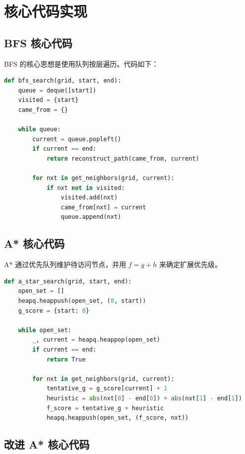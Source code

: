 \chapter{核心代码实现}\label{chap:code}

\section{BFS 核心代码}

BFS 的核心思想是使用队列按层遍历。代码如下：

\begin{lstlisting}[language=Python,caption={BFS 的核心实现},label={code:bfs}]
def bfs_search(grid, start, end):
    queue = deque([start])
    visited = {start}
    came_from = {}

    while queue:
        current = queue.popleft()
        if current == end:
            return reconstruct_path(came_from, current)

        for nxt in get_neighbors(grid, current):
            if nxt not in visited:
                visited.add(nxt)
                came_from[nxt] = current
                queue.append(nxt)
\end{lstlisting}

\section{A* 核心代码}

A* 通过优先队列维护待访问节点，并用 $f=g+h$ 来确定扩展优先级。

\begin{lstlisting}[language=Python,caption={A* 的节点扩展逻辑},label={code:astar}]
def a_star_search(grid, start, end):
    open_set = []
    heapq.heappush(open_set, (0, start))
    g_score = {start: 0}

    while open_set:
        _, current = heapq.heappop(open_set)
        if current == end:
            return True

        for nxt in get_neighbors(grid, current):
            tentative_g = g_score[current] + 1
            heuristic = abs(nxt[0] - end[0]) + abs(nxt[1] - end[1])
            f_score = tentative_g + heuristic
            heapq.heappush(open_set, (f_score, nxt))
\end{lstlisting}

\section{改进 A* 核心代码}

